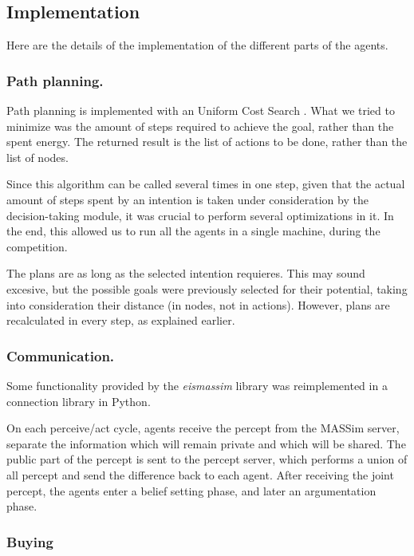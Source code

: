 \documentclass{llncs2e/llncs}
\begin{document}
\subsection{Implementation}

    Here are the details of the implementation of the different parts of the
    agents.

\subsubsection{Path planning.}

    Path planning is implemented with an Uniform Cost Search 
    \cite{Russell:2003:AIM:773294}. 
    What we tried to minimize was the amount of steps required to achieve the 
    goal, rather than the spent energy. 
    The returned result is the list of actions to be done, rather than the list of 
    nodes.
    
    Since this algorithm can be called several times in one step, given that the 
    actual amount of steps spent by an intention is taken under consideration by 
    the decision-taking module, it was crucial to perform several optimizations in 
    it. In the end, this allowed us to run all the agents in a single machine, 
    during the competition.
    
    The plans are as long as the selected intention requieres. This may 
    sound excesive, but the possible goals were previously selected for their 
    potential, taking into consideration their distance (in nodes, not in 
    actions). However, plans are recalculated in every step, as explained earlier.

\subsubsection{Communication.}

    Some functionality provided by the \textit{eismassim} library was
    reimplemented in a connection library in Python.

    On each perceive/act cycle, agents receive the percept from the MASSim server, 
    separate the information which will remain private and which will be shared. 
    The public part of the percept is sent to the percept server, which performs a 
    union of all percept and send the difference back to each agent. After 
    receiving the joint percept, the agents enter a belief setting phase, and 
    later an argumentation phase.
    
\subsubsection{Buying}
\end{document}
